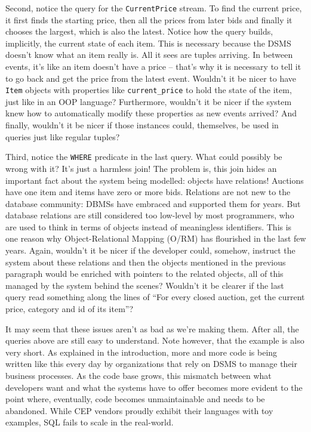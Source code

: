\documentclass{report}
\begin{document}
Second, notice the query for the \verb=CurrentPrice= stream. To find the current price, it first finds the starting price, then all the prices from later bids and finally it chooses the largest, which is also the latest. Notice how the query builds, implicitly, the current state of each item. This is necessary because the DSMS doesn't know what an item really is. All it sees are tuples arriving. In between events, it's like an item doesn't have a price -- that's why it is necessary to tell it to go back and get the price from the latest event. Wouldn't it be nicer to have \verb=Item= objects with properties like \verb=current_price= to hold the state of the item, just like in an OOP language? Furthermore, wouldn't it be nicer if the system knew how to automatically modify these properties as new events arrived? And finally, wouldn't it be nicer if those instances could, themselves, be used in queries just like regular tuples?

Third, notice the \verb=WHERE= predicate in the last query. What could possibly be wrong with it? It's just a harmless join! The problem is, this join hides an important fact about the system being modelled: objects have relations! Auctions have one item and items have zero or more bids. Relations are not new to the database community: DBMSs have embraced and supported them for years. But database relations are still considered too low-level by most programmers, who are used to think in terms of objects instead of meaningless identifiers. This is one reason why Object-Relational Mapping (O/RM) has flourished in the last few years. Again, wouldn't it be nicer if the developer could, somehow, instruct the system about these relations and then the objects mentioned in the previous paragraph would be enriched with pointers to the related objects, all of this managed by the system behind the scenes? Wouldn't it be clearer if the last query read something along the lines of ``For every closed auction, get the current price, category and id of its item''?

It may seem that these issues aren't as bad as we're making them. After all, the queries above are still easy to understand. Note however, that the example is also very short. As explained in the introduction, more and more code is being written like this every day by organizations that rely on DSMS to manage their business processes. As the code base grows, this mismatch between what developers want and what the systems have to offer becomes more evident to the point where, eventually, code becomes unmaintainable and needs to be abandoned. While CEP vendors proudly exhibit their languages with toy examples, SQL fails to scale in the real-world.
\end{document}
